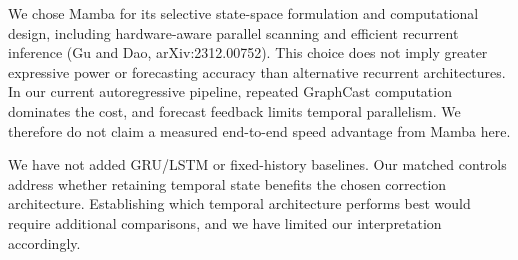 \documentclass[11pt]{article}
\begin{document}
We chose Mamba for its selective state-space formulation and computational design, including hardware-aware parallel scanning and efficient recurrent inference (Gu and Dao, arXiv:2312.00752). This choice does not imply greater expressive power or forecasting accuracy than alternative recurrent architectures. In our current autoregressive pipeline, repeated GraphCast computation dominates the cost, and forecast feedback limits temporal parallelism. We therefore do not claim a measured end-to-end speed advantage from Mamba here.

We have not added GRU/LSTM or fixed-history baselines. Our matched controls address whether retaining temporal state benefits the chosen correction architecture. Establishing which temporal architecture performs best would require additional comparisons, and we have limited our interpretation accordingly.
\end{document}
